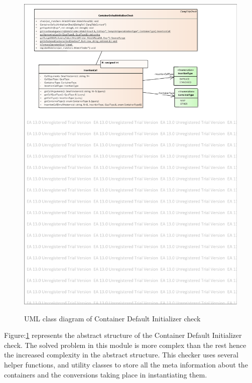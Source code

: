 \begin{figure}[H]
	\caption{UML class diagram of Container Default Initializer check}
	\centering
	\includegraphics[scale=0.85]{images/ContainerDefaultInitializer.pdf}
	\label{container_init_class}
\end{figure}
\par Figure:\ref{container_init_class} represents the abstract structure of the Container Default Initializer check. The solved problem in this module is more complex than the rest hence the increased complexity in the abstract structure. This checker uses several helper functions, and utility classes to store all the meta information about the containers and the conversions taking place in instantiating them. 
